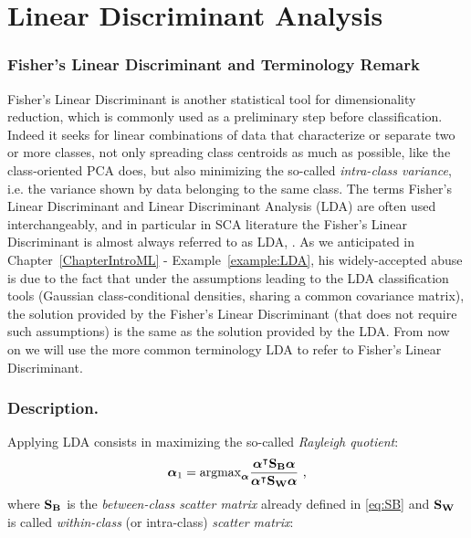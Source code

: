
\section{Linear Discriminant Analysis}\label{sec:LDA}

\subsubsection{Fisher's Linear Discriminant and Terminology Remark}
Fisher's Linear Discriminant \cite{Fukunaga} is another statistical tool for dimensionality reduction, which is commonly used as a preliminary step before classification. Indeed it seeks for linear combinations of data that characterize or separate two or more classes, not only spreading class centroids as much as possible, like the class-oriented PCA does, but also minimizing the so-called {\em intra-class variance}, i.e. the variance shown by data belonging to the same class. The terms Fisher's Linear Discriminant and Linear Discriminant Analysis (LDA) are often used interchangeably, and in particular in SCA literature the Fisher's Linear Discriminant is almost always referred to as LDA, \eg \cite{lessIsMore,Standaert2008}. As we anticipated in Chapter~\ref{ChapterIntroML} - Example~\ref{example:LDA}, his widely-accepted abuse is due to the fact that under the assumptions leading to the LDA classification tools (\ie Gaussian class-conditional densities, sharing a common covariance matrix), the solution provided by the Fisher's Linear Discriminant (that does not require such assumptions) is the same as the solution provided by the LDA. From now on we will use the more common terminology LDA to refer to Fisher's Linear Discriminant. \\

\subsubsection{Description.} Applying LDA consists in maximizing the so-called {\em Rayleigh quotient}:
 \begin{equation}\label{eq:LDA}
 \boldsymbol{\alpha}_1=\mathrm{argmax}_{\boldsymbol{\alpha}} \frac{\boldsymbol{\alpha}^\intercal \textbf{S}_{\textbf{B}} \boldsymbol{\alpha}}{\boldsymbol{\alpha}^\intercal \textbf{S}_{\textbf{W}} \boldsymbol{\alpha}} \mbox{ ,}
 \end{equation}
where $\textbf{S}_{\textbf{B}}$ is the {\em between-class scatter matrix} already defined in \eqref{eq:SB} and $\textbf{S}_{\textbf{W}}$ is called 
{\em within-class} (or intra-class) {\em scatter matrix}:

